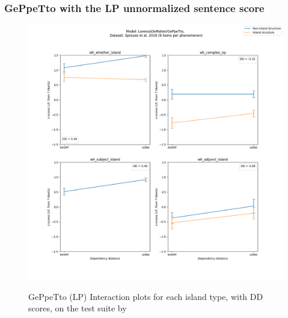 \subsubsection{GePpeTto with the LP unnormalized sentence score}
\begin{figure}[h]
	\centering
	\includegraphics[width=1\textwidth]{images/AppendixA/Sprouse_wh_LorenzoDeMattei_GePpeTto_LP-zscores-likert-2022-09-14_h17m23s51.png} 
	\label{A-fig:sprouse_gpt_lp}
	\caption{GePpeTto (LP) Interaction plots for each island type, with DD scores, on the test suite by \citet{sprouse2016experimental}}
\end{figure}
\clearpage
